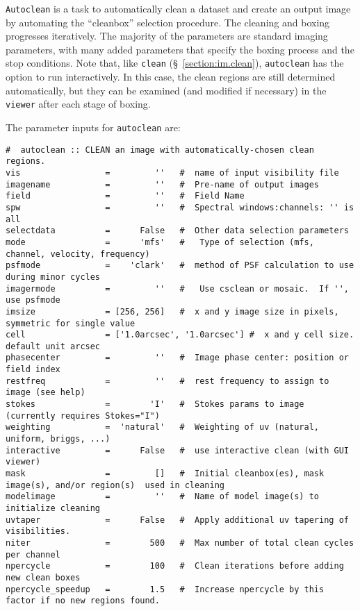 {\tt Autoclean} is a task to automatically clean a dataset and create an output
image by automating the ``cleanbox'' selection procedure.  The cleaning and
boxing progresses iteratively.  The majority of the parameters are standard
imaging parameters, with many added parameters that specify the boxing process
and the stop conditions.  Note that, like {\tt clean}
(\S~\ref{section:im.clean}), {\tt autoclean} has the option to run
interactively.  In this case, the clean regions are still determined
automatically, but they can be examined (and modified if necessary) in the {\tt
viewer} after each stage of boxing.

The parameter inputs for {\tt autoclean} are:
\small
\begin{verbatim}
#  autoclean :: CLEAN an image with automatically-chosen clean regions.
vis                 =         ''   #  name of input visibility file
imagename           =         ''   #  Pre-name of output images
field               =         ''   #  Field Name
spw                 =         ''   #  Spectral windows:channels: '' is all
selectdata          =      False   #  Other data selection parameters
mode                =      'mfs'   #   Type of selection (mfs, channel, velocity, frequency)
psfmode             =    'clark'   #  method of PSF calculation to use during minor cycles
imagermode          =         ''   #   Use csclean or mosaic.  If '', use psfmode
imsize              = [256, 256]   #  x and y image size in pixels, symmetric for single value
cell                = ['1.0arcsec', '1.0arcsec'] #  x and y cell size. default unit arcsec
phasecenter         =         ''   #  Image phase center: position or field index
restfreq            =         ''   #  rest frequency to assign to image (see help)
stokes              =        'I'   #  Stokes params to image (currently requires Stokes="I")
weighting           =  'natural'   #  Weighting of uv (natural, uniform, briggs, ...)
interactive         =      False   #  use interactive clean (with GUI viewer)
mask                =         []   #  Initial cleanbox(es), mask image(s), and/or region(s)  used in cleaning
modelimage          =         ''   #  Name of model image(s) to initialize cleaning
uvtaper             =      False   #  Apply additional uv tapering of visibilities.
niter               =        500   #  Max number of total clean cycles per channel
npercycle           =        100   #  Clean iterations before adding new clean boxes
npercycle_speedup   =        1.5   #  Increase npercycle by this factor if no new regions found.

\end{verbatim}
